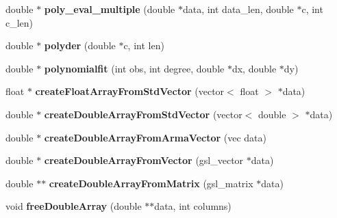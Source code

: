 \begin{DoxyCompactItemize}
\item 
\hypertarget{namespacekukadu_aae0e37983e2b1493297e7a040daf9345}{double $\ast$ {\bfseries poly\-\_\-eval\-\_\-multiple} (double $\ast$data, int data\-\_\-len, double $\ast$c, int c\-\_\-len)}\label{namespacekukadu_aae0e37983e2b1493297e7a040daf9345}

\item 
\hypertarget{namespacekukadu_acfe00d72c77824b38682dc8172405fc0}{double $\ast$ {\bfseries polyder} (double $\ast$c, int len)}\label{namespacekukadu_acfe00d72c77824b38682dc8172405fc0}

\item 
\hypertarget{namespacekukadu_ad112ecf6a165eb85f5573dfd8acb240e}{double $\ast$ {\bfseries polynomialfit} (int obs, int degree, double $\ast$dx, double $\ast$dy)}\label{namespacekukadu_ad112ecf6a165eb85f5573dfd8acb240e}

\item 
\hypertarget{namespacekukadu_ae9d541d44f8331748da2e6a5df11b5ff}{float $\ast$ {\bfseries create\-Float\-Array\-From\-Std\-Vector} (vector$<$ float $>$ $\ast$data)}\label{namespacekukadu_ae9d541d44f8331748da2e6a5df11b5ff}

\item 
\hypertarget{namespacekukadu_ab44f7624668bea31213745273cea7536}{double $\ast$ {\bfseries create\-Double\-Array\-From\-Std\-Vector} (vector$<$ double $>$ $\ast$data)}\label{namespacekukadu_ab44f7624668bea31213745273cea7536}

\item 
\hypertarget{namespacekukadu_a9fd78f70078a0656d2c7c93623cff1b4}{double $\ast$ {\bfseries create\-Double\-Array\-From\-Arma\-Vector} (vec data)}\label{namespacekukadu_a9fd78f70078a0656d2c7c93623cff1b4}

\item 
\hypertarget{namespacekukadu_a5fdba147bef04021392da0a56d126478}{double $\ast$ {\bfseries create\-Double\-Array\-From\-Vector} (gsl\-\_\-vector $\ast$data)}\label{namespacekukadu_a5fdba147bef04021392da0a56d126478}

\item 
\hypertarget{namespacekukadu_aa1357fb2a6908fa37f7640c5537677ae}{double $\ast$$\ast$ {\bfseries create\-Double\-Array\-From\-Matrix} (gsl\-\_\-matrix $\ast$data)}\label{namespacekukadu_aa1357fb2a6908fa37f7640c5537677ae}

\item 
\hypertarget{namespacekukadu_a2355ace0f2bbc7fe4dbd6c6b6b8ffe15}{void {\bfseries free\-Double\-Array} (double $\ast$$\ast$data, int columns)}\label{namespacekukadu_a2355ace0f2bbc7fe4dbd6c6b6b8ffe15}


\end{DoxyCompactItemize}
